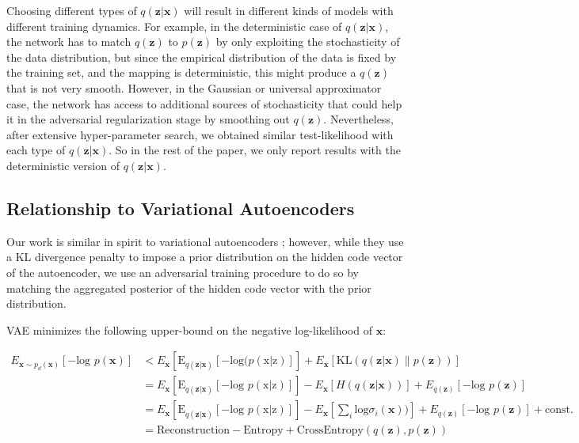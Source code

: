 \documentclass{article}
\begin{document}
Choosing different types of $q(\mathbf{z}|\mathbf{x})$ will result in different kinds of models with different training dynamics. For example, in the deterministic case of $q(\mathbf{z}|\mathbf{x})$, the network has to match $q(\mathbf{z})$ to $p(\mathbf{z})$ by only exploiting the stochasticity of the data distribution, but since the empirical distribution of the data is fixed by the training set, and the mapping is deterministic, this might produce a $q(\mathbf{z})$ that is not very smooth. However, in the Gaussian or universal approximator case, the network has access to additional sources of stochasticity that could help it in the adversarial regularization stage by smoothing out $q(\mathbf{z})$. Nevertheless, after extensive hyper-parameter search, we obtained similar test-likelihood with each type of $q(\mathbf{z}|\mathbf{x})$. So in the rest of the paper, we only report results with the deterministic version of $q(\mathbf{z}|\mathbf{x})$.


\subsection{Relationship to Variational Autoencoders}

Our work is similar in spirit to variational autoencoders \citep{vae}; however, while they use a KL divergence penalty to impose a prior distribution on the hidden code vector of the autoencoder, we use an adversarial training procedure to do so by matching the aggregated posterior of the hidden code vector with the prior distribution.

VAE \citep{vae} minimizes the following upper-bound on the negative log-likelihood of $\mathbf{x}$:

\begin{equation} \label{vae}
\begin{split}
E_{\mathbf{x} \sim p_d(\mathbf{x})}[-\text{log } p(\mathbf{x})] &< E_{\mathbf{x}}[\text{E}_{q(\mathbf{z}|\mathbf{x})} [-\text{log}(p(\text{x}|\text{z})]] + E_{\mathbf{x}} [\text{KL}( q(\mathbf{z}|\mathbf{x}) \| p(\mathbf{z}) )]\\
  &=  E_{\mathbf{x}}[\text{E}_{q(\mathbf{z}|\mathbf{x})} [-\text{log }p(\text{x}|\text{z})]] - E_{\mathbf{x}}[H({q(\mathbf{z}|\mathbf{x})})] + E_{q(\mathbf{z})}[-\text{log } p(\mathbf{z})] \\
  &=  E_{\mathbf{x}}[\text{E}_{q(\mathbf{z}|\mathbf{x})} [-\text{log }p(\text{x}|\text{z})]] - E_{\mathbf{x}}[\sum_i \text{log} \sigma_i(\mathbf{x}))] + E_{q(\mathbf{z})}[-\text{log } p(\mathbf{z})] + \text{const.}\\
 &= \text{Reconstruction} - \text{Entropy} + \text{CrossEntropy}(q(\mathbf{z}),p(\mathbf{z}))
\end{split}
\end{equation}
\end{document}
